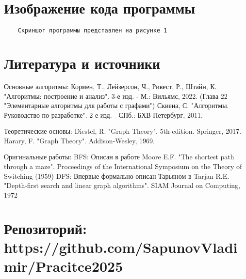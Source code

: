 \documentclass{article}
\begin{document}
    \section{Изображение кода программы}
    \begin{verbatim}
    Скриншот программы представлен на рисунке 1
    \end{verbatim}
    \section{Литература и источники}
    \item Основные алгоритмы:
Кормен, Т., Лейзерсон, Ч., Ривест, Р., Штайн, К. "Алгоритмы: построение и анализ". 3-е
изд. - М.: Вильямс, 2022. (Глава 22 "Элементарные алгоритмы для работы с
графами")
Скиена, С. "Алгоритмы. Руководство по разработке". 2-е изд. - СПб.: БХВ-Петербург,
2011.
\item Теоретические основы:
Diestel, R. "Graph Theory". 5th edition. Springer, 2017.
Harary, F. "Graph Theory". Addison-Wesley, 1969.
\item Оригинальные работы:
BFS: Описан в работе Moore E.F. "The shortest path through a maze". Proceedings of the
International Symposium on the Theory of Switching (1959)
DFS: Впервые формально описан Тарьяном в Tarjan R.E. "Depth-first search and linear
graph algorithms". SIAM Journal on Computing, 1972
\section{Репозиторий: https://github.com/SapunovVladimir/Pracitce2025}
\end{document}
